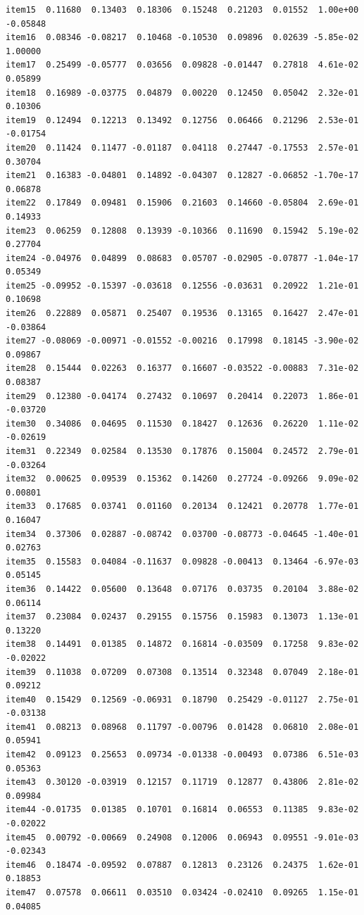 \documentclass[
  a4paper,
]{ltjsbook}
\begin{document}
\begin{verbatim}
item15  0.11680  0.13403  0.18306  0.15248  0.21203  0.01552  1.00e+00 -0.05848
item16  0.08346 -0.08217  0.10468 -0.10530  0.09896  0.02639 -5.85e-02  1.00000
item17  0.25499 -0.05777  0.03656  0.09828 -0.01447  0.27818  4.61e-02  0.05899
item18  0.16989 -0.03775  0.04879  0.00220  0.12450  0.05042  2.32e-01  0.10306
item19  0.12494  0.12213  0.13492  0.12756  0.06466  0.21296  2.53e-01 -0.01754
item20  0.11424  0.11477 -0.01187  0.04118  0.27447 -0.17553  2.57e-01  0.30704
item21  0.16383 -0.04801  0.14892 -0.04307  0.12827 -0.06852 -1.70e-17  0.06878
item22  0.17849  0.09481  0.15906  0.21603  0.14660 -0.05804  2.69e-01  0.14933
item23  0.06259  0.12808  0.13939 -0.10366  0.11690  0.15942  5.19e-02  0.27704
item24 -0.04976  0.04899  0.08683  0.05707 -0.02905 -0.07877 -1.04e-17  0.05349
item25 -0.09952 -0.15397 -0.03618  0.12556 -0.03631  0.20922  1.21e-01  0.10698
item26  0.22889  0.05871  0.25407  0.19536  0.13165  0.16427  2.47e-01 -0.03864
item27 -0.08069 -0.00971 -0.01552 -0.00216  0.17998  0.18145 -3.90e-02  0.09867
item28  0.15444  0.02263  0.16377  0.16607 -0.03522 -0.00883  7.31e-02  0.08387
item29  0.12380 -0.04174  0.27432  0.10697  0.20414  0.22073  1.86e-01 -0.03720
item30  0.34086  0.04695  0.11530  0.18427  0.12636  0.26220  1.11e-02 -0.02619
item31  0.22349  0.02584  0.13530  0.17876  0.15004  0.24572  2.79e-01 -0.03264
item32  0.00625  0.09539  0.15362  0.14260  0.27724 -0.09266  9.09e-02  0.00801
item33  0.17685  0.03741  0.01160  0.20134  0.12421  0.20778  1.77e-01  0.16047
item34  0.37306  0.02887 -0.08742  0.03700 -0.08773 -0.04645 -1.40e-01  0.02763
item35  0.15583  0.04084 -0.11637  0.09828 -0.00413  0.13464 -6.97e-03  0.05145
item36  0.14422  0.05600  0.13648  0.07176  0.03735  0.20104  3.88e-02  0.06114
item37  0.23084  0.02437  0.29155  0.15756  0.15983  0.13073  1.13e-01  0.13220
item38  0.14491  0.01385  0.14872  0.16814 -0.03509  0.17258  9.83e-02 -0.02022
item39  0.11038  0.07209  0.07308  0.13514  0.32348  0.07049  2.18e-01  0.09212
item40  0.15429  0.12569 -0.06931  0.18790  0.25429 -0.01127  2.75e-01 -0.03138
item41  0.08213  0.08968  0.11797 -0.00796  0.01428  0.06810  2.08e-01  0.05941
item42  0.09123  0.25653  0.09734 -0.01338 -0.00493  0.07386  6.51e-03  0.05363
item43  0.30120 -0.03919  0.12157  0.11719  0.12877  0.43806  2.81e-02  0.09984
item44 -0.01735  0.01385  0.10701  0.16814  0.06553  0.11385  9.83e-02 -0.02022
item45  0.00792 -0.00669  0.24908  0.12006  0.06943  0.09551 -9.01e-03 -0.02343
item46  0.18474 -0.09592  0.07887  0.12813  0.23126  0.24375  1.62e-01  0.18853
item47  0.07578  0.06611  0.03510  0.03424 -0.02410  0.09265  1.15e-01  0.04085

\end{verbatim}
\end{document}
